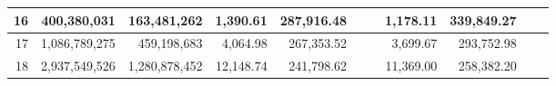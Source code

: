 \documentclass[conference]{IEEEtran}
\newcommand{\matr}[1]{\mathbf{#1}} %
\begin{document}
\begin{table*}[tb]
\begin{threeparttable}[c]
\begin{tabular}{r|rr|rr|rr|rr|rr}
\hline                                                                                                                    
16 & 400,380,031 & 163,481,262 & 1,390.61 & 287,916.48 &  &  & 1,178.11 & 339,849.27 &  &  \\                             
\hline                                                                                                                    
17 & 1,086,789,275 & 459,198,683 & 4,064.98 & 267,353.52 &  &  & 3,699.67 & 293,752.98 &  &  \\                           
\hline                                                                                                                    
18 & 2,937,549,526 & 1,280,878,452 & 12,148.74 & 241,798.62 &  &  & 11,369.00 & 258,382.20 &  &  \\
\end{tabular}
\end{threeparttable}
\vspace{-1.5em}
\end{table*}






%
%
\end{document}
